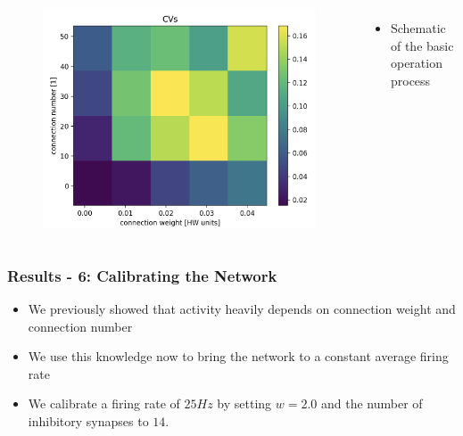 \documentclass{beamer}
\begin{document}
\begin{frame}
\begin{columns}
          \begin{figure}
    				\centering
    				\includegraphics[width=\linewidth]{figures/CV_sweep.png}
 		   \end{figure}
 		   \begin{itemize}
          		\item Schematic of the basic operation process
          	\end{itemize}

	\end{columns}

\end{frame}

\begin{frame}
	\frametitle{Results - 6: Calibrating the Network}
	\begin{itemize}
		\item We previously showed that activity heavily depends on connection weight
		and connection number
		\item We use this knowledge now to bring the network to a constant average
		firing rate
		\item We calibrate a firing rate of $25Hz$ by setting $w=2.0$ and the number
		of inhibitory synapses to $14$.
	\end{itemize}
\end{frame}
\end{document}
